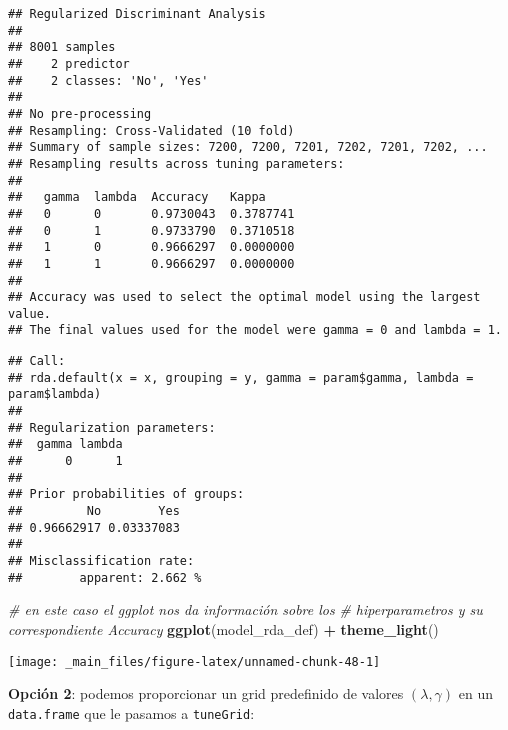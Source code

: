 \documentclass[]{book}
\newenvironment{Shaded}{\begin{snugshade}}{\end{snugshade}}
\newcommand{\CommentTok}[1]{\textcolor[rgb]{0.56,0.35,0.01}{\textit{#1}}}
\newcommand{\KeywordTok}[1]{\textcolor[rgb]{0.13,0.29,0.53}{\textbf{#1}}}
\newcommand{\NormalTok}[1]{#1}
\newcommand{\OperatorTok}[1]{\textcolor[rgb]{0.81,0.36,0.00}{\textbf{#1}}}
\newcommand{\StringTok}[1]{\textcolor[rgb]{0.31,0.60,0.02}{#1}}
\begin{document}
\begin{verbatim}
## Regularized Discriminant Analysis 
## 
## 8001 samples
##    2 predictor
##    2 classes: 'No', 'Yes' 
## 
## No pre-processing
## Resampling: Cross-Validated (10 fold) 
## Summary of sample sizes: 7200, 7200, 7201, 7202, 7201, 7202, ... 
## Resampling results across tuning parameters:
## 
##   gamma  lambda  Accuracy   Kappa    
##   0      0       0.9730043  0.3787741
##   0      1       0.9733790  0.3710518
##   1      0       0.9666297  0.0000000
##   1      1       0.9666297  0.0000000
## 
## Accuracy was used to select the optimal model using the largest value.
## The final values used for the model were gamma = 0 and lambda = 1.
\end{verbatim}

\begin{Shaded}
\end{Shaded}

\begin{verbatim}
## Call: 
## rda.default(x = x, grouping = y, gamma = param$gamma, lambda = param$lambda)
## 
## Regularization parameters: 
##  gamma lambda 
##      0      1 
## 
## Prior probabilities of groups: 
##         No        Yes 
## 0.96662917 0.03337083 
## 
## Misclassification rate: 
##        apparent: 2.662 %
\end{verbatim}

\begin{Shaded}
\begin{Highlighting}[]
\CommentTok{# en este caso el ggplot nos da información sobre los }
\CommentTok{# hiperparametros y su correspondiente Accuracy}
\KeywordTok{ggplot}\NormalTok{(model_rda_def) }\OperatorTok{+}\StringTok{ }\KeywordTok{theme_light}\NormalTok{()}
\end{Highlighting}
\end{Shaded}

\begin{center}\texttt{[image: \_main\_files/figure-latex/unnamed-chunk-48-1]} \end{center}

\textbf{Opción 2}: podemos proporcionar un grid predefinido de valores \((\lambda, \gamma)\) en un \texttt{data.frame} que le pasamos a \texttt{tuneGrid}:
\end{document}
